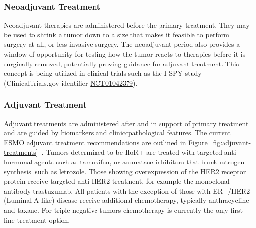 \documentclass[11pt]{book}
\begin{document}
\subsubsection{Neoadjuvant Treatment}

Neoadjuvant therapies are administered before the primary treatment. They may be used to shrink a tumor down to a size that makes it feasible to perform surgery at all, or less invasive surgery. The neoadjuvant period also provides a window of opportunity for testing how the tumor reacts to therapies before it is surgically removed, potentially proving guidance for adjuvant treatment. This concept is being utilized in clinical trials such as the I-SPY study~\cite{Barker:2009} (ClinicalTrials.gov identifier \href{https://clinicaltrials.gov/ct2/show/NCT01042379}{NCT01042379}).

\subsubsection{Adjuvant Treatment}

Adjuvant treatments are administered after and in support of primary treatment and are guided by biomarkers and clinicopathological features. The current ESMO adjuvant treatment recommendations are outlined in Figure~\ref{fig:adjuvant-treatments}~\cite{Cardoso:2019}. Tumors determined to be HoR+ are treated with targeted anti-hormonal agents such as tamoxifen, or aromatase inhibitors that block estrogen synthesis, such as letrozole. Those showing overexpression of the HER2 receptor protein receive targeted anti-HER2 treatment, for example the monoclonal antibody trastuzumab. All patients with the exception of those with ER+/HER2- (Luminal A-like) disease receive additional chemotherapy, typically anthracycline and taxane. For triple-negative tumors chemotherapy is currently the only first-line treatment option.
\end{document}

